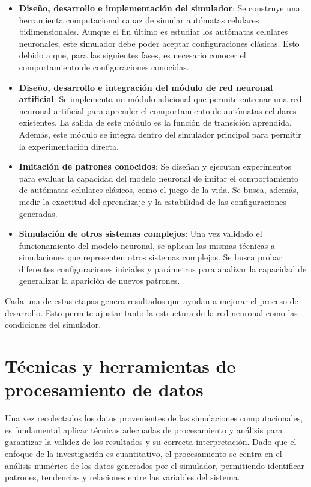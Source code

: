 \begin{itemize}
	
	\item \textbf{Diseño, desarrollo e implementación del simulador}: Se construye una herramienta computacional capaz de simular autómatas celulares bidimensionales. Aunque el fin último es estudiar los autómatas celulares neuronales, este simulador debe poder aceptar configuraciones clásicas. Esto debido a que, para las siguientes fases, es necesario conocer el comportamiento de configuraciones conocidas.
	
	\item \textbf{Diseño, desarrollo e integración del módulo de red neuronal artificial}: Se implementa un módulo adicional que permite entrenar una red neuronal artificial para aprender el comportamiento de autómatas celulares existentes. La salida de este módulo es la función de transición aprendida. Además, este módulo se integra dentro del simulador principal para permitir la experimentación directa.
	
	\item \textbf{Imitación de patrones conocidos}: Se diseñan y ejecutan experimentos para evaluar la capacidad del modelo neuronal de imitar el comportamiento de autómatas celulares clásicos, como el juego de la vida. Se busca, además, medir la exactitud del aprendizaje y la estabilidad de las configuraciones generadas. 
	
	\item \textbf{Simulación de otros sistemas complejos}: Una vez validado el funcionamiento del modelo neuronal, se aplican las mismas técnicas a simulaciones que representen otros sistemas complejos. Se busca probar diferentes configuraciones iniciales y parámetros para analizar la capacidad de generalizar la aparición de nuevos patrones.
	
\end{itemize}

Cada una de estas etapas genera resultados que ayudan a mejorar el proceso de desarrollo. Esto permite ajustar tanto la estructura de la red neuronal como las condiciones del simulador.

\section{Técnicas y herramientas de procesamiento de datos}

Una vez recolectados los datos provenientes de las simulaciones computacionales, es fundamental aplicar técnicas adecuadas de procesamiento y análisis para garantizar la validez de los resultados y su correcta interpretación. Dado que el enfoque de la investigación es cuantitativo, el procesamiento se centra en el análisis numérico de los datos generados por el simulador, permitiendo identificar patrones, tendencias y relaciones entre las variables del sistema.

